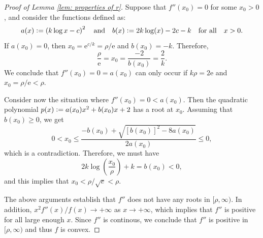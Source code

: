 \documentclass[a4paper, 12pt]{article}
\theoremstyle{definition}
\newcommand{\defeq}{\vcentcolon=}
\newcommand{\e}{\mathrm{e}}
\begin{document}
\begin{appendices}
\begin{proof}[Proof of Lemma \ref{lem: properties of r}]
	Suppose that $f''(x_0) = 0$ for some $x_0 > 0$, and consider the functions defined as:
	\begin{equation*}
		a(x) \defeq \left(k\log x - c\right)^2 \quad \text{and} \quad b(x) \defeq 2k\log(x) - 2c - k \quad \text{for all} \quad x > 0.
	\end{equation*}
	If $a(x_0) = 0$, then $x_0 = \e^{c / k} = \rho / \e$ and $b(x_0) = -k$. Therefore,
	\begin{equation*}
		\frac{\rho}{\e} = x_0 = \frac{-2}{b(x_0)} = \frac{2}{k}.
	\end{equation*}
	We conclude that $f''(x_0) = 0 = a(x_0)$ can only occur if $k \rho = 2 \e$ and $x_0 = \rho / \e < \rho$.
	
	Consider now the situation where $f''(x_0) = 0 < a(x_0)$. Then the quadratic polynomial $p(x) \defeq a(x_0) x^2 + b(x_0)x + 2$ has a root at $x_0$.  Assuming that $b(x_0) \geq 0$, we get
	\begin{equation*}
		0 < x_0 \leq \frac{-b(x_0) + \sqrt{\left[b(x_0)\right]^2 - 8a(x_0)}}{2a(x_0)} \leq 0,
	\end{equation*}
	which is a contradiction. Therefore, we must have
	\begin{equation*}
		2k\log\left(\frac{x_0}{\rho}\right) + k = b(x_0) < 0,
	\end{equation*}
	and this implies that $x_0 < \rho / \sqrt{e} < \rho$.
	
	The above arguments establish that $f''$ does not have any roots in $[\rho, \infty)$. In addition, $x^2 f''(x) / f(x) \to +\infty$ as $x \to +\infty$, which implies that $f''$ is positive for all large enough $x$. Since $f''$ is continous, we conclude that $f''$ is positive in $[\rho, \infty)$ and thus $f$ is convex.
\end{proof}

\end{appendices}
	
\newcommand{\noop}[1]{}


	
\end{document}
